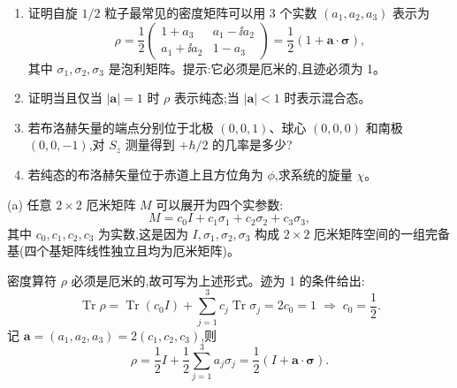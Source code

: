 \begin{question}
\begin{enumerate}
\item 证明自旋 $1/2$ 粒子最常见的密度矩阵可以用 3 个实数 $(a_1,a_2,a_3)$ 表示为
\[
\rho=\frac12\begin{pmatrix}1+a_3&a_1-\ii a_2\\a_1+\ii a_2&1-a_3\end{pmatrix}=\frac12(1+\mathbf a\cdot\boldsymbol\sigma),
\]
其中 $\sigma_1,\sigma_2,\sigma_3$ 是泡利矩阵。提示:它必须是厄米的,且迹必须为 1。
\item 证明当且仅当 $|\mathbf a|=1$ 时 $\rho$ 表示纯态;当 $|\mathbf a|<1$ 时表示混合态。
\item 若布洛赫矢量的端点分别位于北极 $(0,0,1)$、球心 $(0,0,0)$ 和南极 $(0,0,-1)$,对 $S_z$ 测量得到 $+\hbar/2$ 的几率是多少?
\item 若纯态的布洛赫矢量位于赤道上且方位角为 $\phi$,求系统的旋量 $\chi$。
\end{enumerate}
\begin{solution}
(a) 任意 $2\times2$ 厄米矩阵 $M$ 可以展开为四个实参数:
\[
M = c_0 I + c_1\sigma_1 + c_2\sigma_2 + c_3\sigma_3,
\]
其中 $c_0,c_1,c_2,c_3$ 为实数,这是因为 $I,\sigma_1,\sigma_2,\sigma_3$ 构成 $2\times2$ 厄米矩阵空间的一组完备基(四个基矩阵线性独立且均为厄米矩阵)。

密度算符 $\rho$ 必须是厄米的,故可写为上述形式。迹为 1 的条件给出:
\[
\operatorname{Tr}\rho = \operatorname{Tr}(c_0 I) + \sum_{j=1}^3 c_j\operatorname{Tr}\sigma_j = 2c_0 = 1 \;\Longrightarrow\; c_0 = \frac12.
\]
记 $\mathbf a = (a_1,a_2,a_3) = 2(c_1,c_2,c_3)$,则
\[
\rho = \frac12 I + \frac12\sum_{j=1}^3 a_j\sigma_j = \frac12(I + \mathbf a\cdot\boldsymbol\sigma).
\]


\end{solution}
\end{question}
